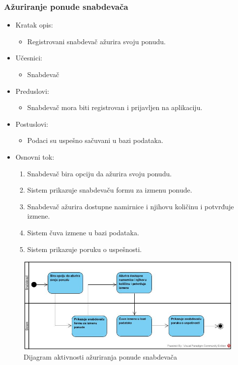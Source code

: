 \subsubsection{Ažuriranje ponude snabdevača}

\begin{itemize}
    \item Kratak opis:
        \begin{itemize}
            \item Registrovani snabdevač ažurira svoju ponudu.
        \end{itemize}
    \item Učesnici:
        \begin{itemize}
            \item Snabdevač
        \end{itemize}
    \item Preduslovi:
        \begin{itemize}
            \item Snabdevač mora biti registrovan i prijavljen na aplikaciju.
        \end{itemize}
    \item Postuslovi:
        \begin{itemize}
            \item Podaci su uspešno sačuvani u bazi podataka.
        \end{itemize}
    \item Osnovni tok:
        \begin{enumerate}
            \item Snabdevač bira opciju da ažurira svoju ponudu.
            \item Sistem prikazuje snabdevaču formu za izmenu ponude.
            \item Snabdevač ažurira dostupne namirnice i njihovu količinu i potvrđuje izmene.
            \item Sistem čuva izmene u bazi podataka.
            \item Sistem prikazuje poruku o uspešnosti. 
        \end{enumerate}
\end{itemize}


\begin{figure}[H]
\begin{center}
\includegraphics[width=\textwidth]{Pictures/activity_update_supplier_account.jpg}
\end{center}
    \caption{Dijagram aktivnosti ažuriranja ponude snabdevača}
\label{fig:ActivityUpdateSupplierAccount}
\end{figure}
